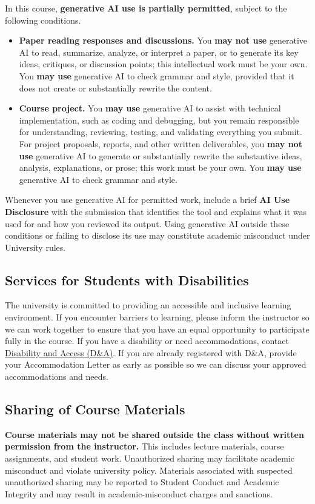 \documentclass[11pt]{article}
\begin{document}
In this course, \textbf{generative AI use is partially permitted}, subject to
the following conditions.
\begin{itemize}
  \item \textbf{Paper reading responses and discussions.} You \textbf{may not use} generative AI to read, summarize, analyze, or interpret a paper, or to generate its key ideas, critiques, or discussion points; this intellectual work must be your own. You \textbf{may use} generative AI to check grammar and style, provided that it does not create or substantially rewrite the content.
  \item \textbf{Course project.} You \textbf{may use} generative AI to assist with technical implementation, such as coding and debugging, but you remain responsible for understanding, reviewing, testing, and validating everything you submit. For project proposals, reports, and other written deliverables, you \textbf{may not use} generative AI to generate or substantially rewrite the substantive ideas, analysis, explanations, or prose; this work must be your own. You \textbf{may use} generative AI to check grammar and style.
\end{itemize}
Whenever you use generative AI for permitted work, include a brief \textbf{AI
Use Disclosure} with the submission that identifies the tool and explains what
it was used for and how you reviewed its output. Using generative AI outside
these conditions or failing to disclose its use may constitute academic
misconduct under University rules.

\subsection{Services for Students with Disabilities}
The university is committed to providing an accessible and inclusive learning
environment. If you encounter barriers to learning, please inform the
instructor so we can work together to ensure that you have an equal
opportunity to participate fully in the course. If you have a disability or
need accommodations, contact \href{https://disability.utexas.edu/}{Disability
and Access (D\&A)}. If you are already registered with D\&A, provide your
Accommodation Letter as early as possible so we can discuss your approved
accommodations and needs.

\subsection{Sharing of Course Materials}
\textbf{Course materials may not be shared outside the class without written
permission from the instructor.} This includes lecture materials, course
assignments, and student work. Unauthorized sharing may facilitate academic
misconduct and violate university policy. Materials associated with suspected
unauthorized sharing may be reported to Student Conduct and Academic Integrity
and may result in academic-misconduct charges and sanctions.
\end{document}
